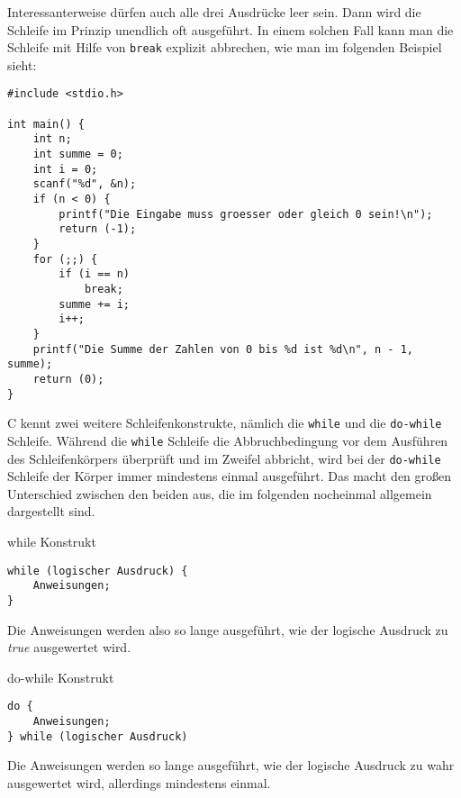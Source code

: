 Interessanterweise dürfen auch alle drei Ausdrücke leer sein.
Dann wird die Schleife im Prinzip unendlich oft ausgeführt.
In einem solchen Fall kann man die Schleife mit Hilfe von \verb|break| explizit abbrechen, wie man im folgenden Beispiel sieht:
\begin{lstlisting}
#include <stdio.h>

int main() {
    int n;
    int summe = 0;
    int i = 0;
    scanf("%d", &n);
    if (n < 0) {
        printf("Die Eingabe muss groesser oder gleich 0 sein!\n");
        return (-1);
    }
    for (;;) {
        if (i == n)
            break;
        summe += i;
        i++;
    }
    printf("Die Summe der Zahlen von 0 bis %d ist %d\n", n - 1, summe);
    return (0);
}
\end{lstlisting}
C kennt zwei weitere Schleifenkonstrukte, nämlich die \verb|while| und die \verb|do-while| Schleife.
Während die \verb|while| Schleife die Abbruchbedingung vor dem Ausführen des Schleifenkörpers überprüft und im Zweifel abbricht, wird bei der \verb|do-while| Schleife der Körper immer mindestens einmal ausgeführt.
Das macht den großen Unterschied zwischen den beiden aus, die im folgenden nocheinmal allgemein dargestellt sind.
\begin{myalertblock}{while Konstrukt}
\begin{lstlisting}
while (logischer Ausdruck) {
    Anweisungen;
}
\end{lstlisting}
\vspace{-0.5cm}
Die Anweisungen werden also so lange ausgeführt, wie der logische Ausdruck zu \emph{true} ausgewertet wird.
\end{myalertblock}

\begin{myalertblock}{do-while Konstrukt}
\begin{lstlisting}
do {
    Anweisungen;
} while (logischer Ausdruck)
\end {lstlisting}
\vspace{-0.5cm}
Die Anweisungen werden so lange ausgeführt, wie der logische Ausdruck zu wahr ausgewertet wird, allerdings mindestens einmal.
\end{myalertblock}

\endinput

